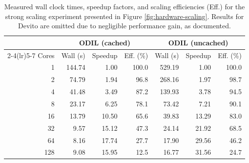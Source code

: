 \documentclass[final-report]{report-template}
\begin{document}
\begin{table}[!htp]
    \centering
    \begin{tabular}{rrrrrrr}
        \toprule
        & \multicolumn{3}{c}{ODIL (cached)} & \multicolumn{3}{c}{ODIL (uncached)} \\
        \cmidrule(lr){2-4}\cmidrule(lr){5-7}
        Cores & Wall (\si{\second}) & Speedup & Eff. (\%) & Wall (\si{\second}) & Speedup & Eff. (\%) \\
        \midrule
        1 & 144.74 & 1.00 & 100.0 & 529.19 & 1.00 & 100.0 \\
        2 & 74.79 & 1.94 & 96.8 & 268.16 & 1.97 & 98.7 \\
        4 & 41.48 & 3.49 & 87.2 & 139.93 & 3.78 & 94.5 \\
        8 & 23.17 & 6.25 & 78.1 & 73.42 & 7.21 & 90.1 \\
        16 & 13.79 & 10.50 & 65.6 & 39.83 & 13.29 & 83.0 \\
        32 & 9.57 & 15.12 & 47.3 & 24.14 & 21.92 & 68.5 \\
        64 & 8.16 & 17.74 & 27.7 & 17.90 & 29.56 & 46.2 \\
        128 & 9.08 & 15.95 & 12.5 & 16.77 & 31.56 & 24.7 \\
        \bottomrule
    \end{tabular}

    \caption{Measured wall clock times, speedup factors, and scaling efficiencies (Eff.) for the strong scaling experiment presented in Figure \ref{fig:hardware-scaling}. Results for Devito are omitted due to negligible performance gain, as documented.}
    \label{tab:results-ss}
\end{table}
\end{document}
